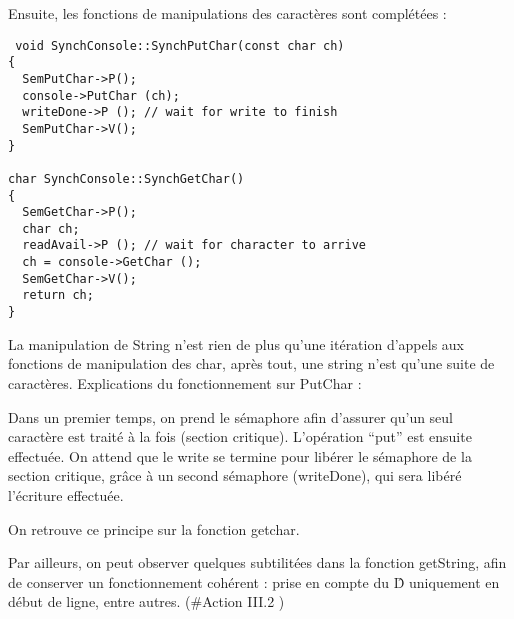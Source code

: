 \documentclass[a4paper,10pt]{article}
\begin{document}
Ensuite, les fonctions de manipulations des caractères sont complétées :
\begin{verbatim}
 void SynchConsole::SynchPutChar(const char ch)
{
  SemPutChar->P();
  console->PutChar (ch);
  writeDone->P (); // wait for write to finish
  SemPutChar->V();
}

char SynchConsole::SynchGetChar()
{
  SemGetChar->P();
  char ch;
  readAvail->P (); // wait for character to arrive
  ch = console->GetChar ();
  SemGetChar->V();
  return ch;
}

\end{verbatim}

La manipulation de String n'est rien de plus qu'une itération d'appels aux fonctions de manipulation des char,
après tout, une string n'est qu'une suite de caractères.
Explications du fonctionnement sur PutChar :

Dans un premier temps, on prend le sémaphore afin d'assurer qu'un seul caractère est traité à la fois (section critique).
L'opération ``put'' est ensuite effectuée. On attend que le write se termine pour libérer le sémaphore de la section critique,
grâce à un second sémaphore (writeDone), qui sera libéré l'écriture effectuée.

On retrouve ce principe sur la fonction getchar.

Par ailleurs, on peut observer quelques subtilitées dans la fonction getString, afin de conserver un fonctionnement cohérent :
prise en compte du \^D uniquement en début de ligne, entre autres. (\#Action III.2 )
\end{document}
